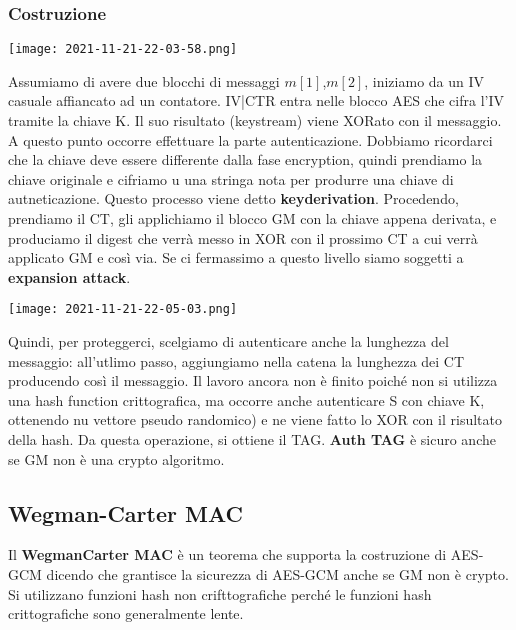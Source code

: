 \documentclass{article}
\theoremstyle{remark}
\begin{document}
\subsubsection*{Costruzione}
\begin{center}
    \texttt{[image: 2021-11-21-22-03-58.png]}
\end{center}
Assumiamo di avere due blocchi di messaggi \(m[1]\),\(m[2]\), iniziamo da un IV casuale affiancato ad un contatore. IV|CTR entra nelle blocco
AES che cifra l'IV tramite la chiave K. Il suo risultato (keystream) viene XORato con il messaggio. A questo punto occorre effettuare la parte 
autenticazione. Dobbiamo ricordarci che la chiave deve essere differente dalla fase encryption, quindi prendiamo la chiave originale e cifriamo u
una stringa nota per produrre una chiave di autneticazione. Questo processo viene detto \textbf{keyderivation}.\newline
Procedendo, prendiamo il CT, gli applichiamo il blocco GM con la chiave appena derivata, e produciamo il digest che verrà messo in XOR con il 
prossimo CT a cui verrà applicato GM e così via. Se ci fermassimo a questo livello siamo soggetti a \textbf{expansion attack}.
\begin{center}
    \texttt{[image: 2021-11-21-22-05-03.png]}
\end{center}
Quindi, per proteggerci, scelgiamo di autenticare anche la lunghezza del messaggio: all'utlimo passo, aggiungiamo nella catena la lunghezza dei CT
producendo così il messaggio. Il lavoro ancora non è finito poiché non si utilizza una hash function crittografica, ma occorre anche autenticare 
S con chiave K, ottenendo nu vettore pseudo randomico) e ne viene fatto lo XOR con il risultato della hash. Da questa operazione, si ottiene il TAG.
\textbf{Auth TAG} è sicuro anche se GM non è una crypto algoritmo.
\subsection{Wegman-Carter MAC}
Il \textbf{WegmanCarter MAC} è un teorema che supporta la costruzione di AES-GCM dicendo che grantisce la sicurezza di AES-GCM anche se GM non è crypto.
Si utilizzano funzioni hash non crifttografiche perché le funzioni hash crittografiche sono generalmente lente.
\end{document}
